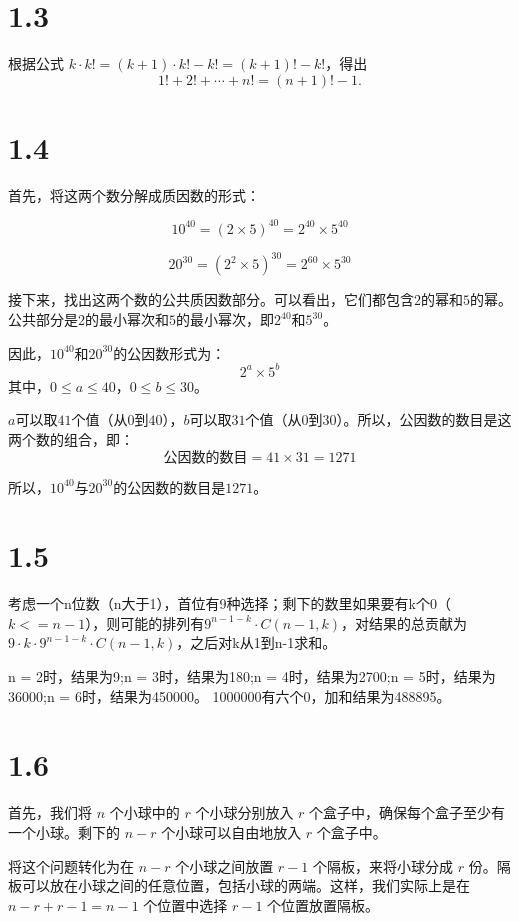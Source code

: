 \documentclass{article}
\begin{document}
\begin{CJK}{UTF8}{gbsn}
\section*{1.3}
根据公式 $k \cdot k! = (k + 1) \cdot k! - k! = (k + 1)! - k!$，得出
\[
1! + 2! + \cdots + n! = (n + 1)! - 1.
\]

\section*{1.4}
首先，将这两个数分解成质因数的形式：

\[
10^{40} = (2 \times 5)^{40} = 2^{40} \times 5^{40}
\]

\[
20^{30} = (2^2 \times 5)^{30} = 2^{60} \times 5^{30}
\]

接下来，找出这两个数的公共质因数部分。可以看出，它们都包含$2$的幂和$5$的幂。公共部分是$2$的最小幂次和$5$的最小幂次，即$2^{40}$和$5^{30}$。

因此，$10^{40}$和$20^{30}$的公因数形式为：
\[
2^a \times 5^b
\]
其中，$0 \leq a \leq 40$，$0 \leq b \leq 30$。

$a$可以取$41$个值（从$0$到$40$），$b$可以取$31$个值（从$0$到$30$）。所以，公因数的数目是这两个数的组合，即：
\[
\text{公因数的数目} = 41 \times 31 = 1271
\]

所以，$10^{40}$与$20^{30}$的公因数的数目是$1271$。

\section*{1.5}
考虑一个n位数（n大于1），首位有9种选择；剩下的数里如果要有k个0（$k<=n-1$），则可能的排列有$9 ^ {n-1-k} \cdot C(n-1, k)$，对结果的总贡献为$9 \cdot k \cdot 9 ^ {n-1-k} \cdot C(n-1, k)$，之后对k从1到n-1求和。

n = 2时，结果为9;n = 3时，结果为180;n = 4时，结果为2700;n = 5时，结果为36000;n = 6时，结果为450000。
1000000有六个0，加和结果为488895。
\section*{1.6}
首先，我们将 \( n \) 个小球中的 \( r \) 个小球分别放入 \( r \) 个盒子中，确保每个盒子至少有一个小球。剩下的 \( n - r \) 个小球可以自由地放入 \( r \) 个盒子中。

将这个问题转化为在 \( n - r \) 个小球之间放置 \( r - 1 \) 个隔板，来将小球分成 \( r \) 份。隔板可以放在小球之间的任意位置，包括小球的两端。这样，我们实际上是在 \( n - r + r - 1 = n - 1 \) 个位置中选择 \( r - 1 \) 个位置放置隔板。


\end{CJK}
\end{document}
